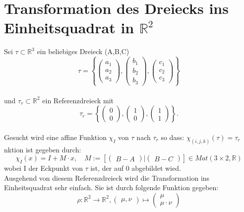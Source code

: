 \documentclass[12pt]{article}
\begin{document}
\section{Transformation des Dreiecks ins \\ Einheitsquadrat in $\mathbb{R}^2$}
Sei $\tau\subset \mathbb{R}^3$ ein beliebiges Dreieck (A,B,C)
\[
\tau = \left \{
\begin{pmatrix} a_1\\ a_2 \\ a_3 \end{pmatrix}
,
\begin{pmatrix} b_1\\ b_2 \\ b_3 \end{pmatrix}
,
\begin{pmatrix} c_1\\ c_2 \\ c_3 \end{pmatrix}
\right \}
\]
\\
und $\tau_r \subset \mathbb{R}^2$ ein Referenzdreieck mit
\[
 \tau_r = \left \{
\begin{pmatrix} 0\\ 0 \end{pmatrix}
,
\begin{pmatrix} 1\\ 0\end{pmatrix}
,
\begin{pmatrix} 1\\ 1\end{pmatrix}
\right \} .
\]
\\
Gesucht wird eine affine Funktion $\chi_I$ von $\tau$ nach $\tau_r$ so dass: $\chi_{(i,j,k)}(\tau) = \tau_r$             nktion ist gegeben durch:
\[
\chi_I(x) = I + M\cdot x, \quad M := \left[
\begin{pmatrix} B-A \end{pmatrix}
|
\begin{pmatrix} B-C \end{pmatrix}
\right]
 \in Mat(3\times 2,\mathbb{R})
\]
wobei I der Eckpunkt von $\tau$ ist, der auf 0 abgebildet wied.
\\
Ausgehend von diesem Referenzdreieck wird die Transformation ins Einheitsquadrat sehr einfach. Sie ist durch folgende Funktion gegeben:
\[
	\rho : \mathbb{R}^2 \rightarrow \mathbb{R}^2, \begin{pmatrix} \mu,\nu \end{pmatrix} \mapsto \begin{pmatrix} \mu\\\mu\cdot\nu \end{pmatrix}
\]
\\
\end{document}
